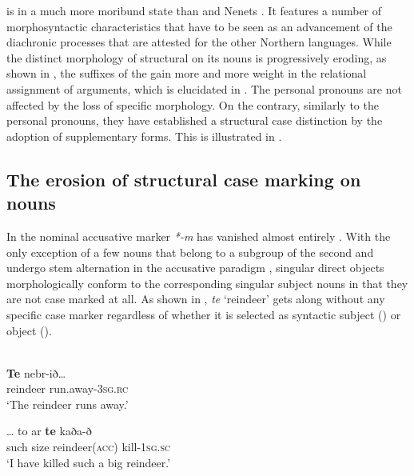 \documentclass[output=paper]{LSP/langsci}
\begin{document}
 is in a much more moribund state than  and Nenets \citep[30--57]{Siegl2013Materials}. It features a number of morphosyntactic characteristics that have to be seen as an advancement of the diachronic processes that are attested for the other Northern  languages. While the distinct morphology of structural  on its nouns is progressively eroding, as shown in , the suffixes of the  gain more and more weight in the relational assignment of arguments, which is elucidated in . The  personal pronouns are not affected by the loss of specific morphology. On the contrary, similarly to the  personal pronouns, they have established a structural case distinction by the adoption of supplementary forms. This is illustrated in .

\subsection{The erosion of structural case marking on nouns}\label{12-wr-sec:5-1}

In  the  nominal accusative marker \textit{*-m} has vanished almost entirely \citep[13–14]{Kunnap1999Enets}. With the only exception of a few nouns that belong to a subgroup of the second  and undergo stem alternation in the accusative paradigm \citep[121--124]{Siegl2013Materials},  singular direct objects morphologically conform to the corresponding singular subject nouns in that they are not case marked at all. As shown in , \textit{te} ‘reindeer’ gets along without any specific case marker regardless of whether it is selected as syntactic subject (\cf {}) or object (\cf {}). 

\ea  \label{12-wr-ex:22} 
\\

\ea  \label{12-wr-ex:22a} 
\gll \textbf{Te } nebr-ið…\\
 reindeer run.away-\textsc{3sg.rc}\\
\glt  ‘The reindeer runs away.’

\ex  \label{12-wr-ex:22b} 
\gll   … to ar \textbf{te} kaða-ð\\
{} such size reindeer(\textsc{acc)} kill\textsc{-1sg.sc}\\
\glt  ‘I have killed such a big reindeer.’
\z
\z
\end{document}
